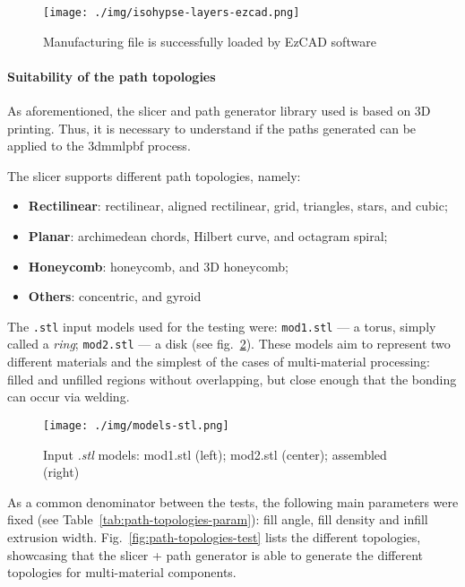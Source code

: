 \begin{figure}[!hbt]
  \centering
  \texttt{[image: ./img/isohypse-layers-ezcad.png]}
  \caption{Manufacturing file is successfully loaded by EzCAD software}%
  \label{fig:isohypse-ezcad}
\end{figure}

\paragraph{Suitability of the path topologies}
As aforementioned, the slicer and path generator library used is based on 3D
printing. Thus, it is necessary to understand if the paths generated can be
applied to the \gls{3dmmlpbf} process.

The slicer supports different path topologies, namely:
\begin{itemize}
\item \textbf{Rectilinear}: rectilinear, aligned rectilinear, grid, triangles,
  stars, and cubic;
\item \textbf{Planar}: archimedean chords, Hilbert curve, and octagram spiral;
\item \textbf{Honeycomb}: honeycomb, and 3D honeycomb;
\item \textbf{Others}: concentric, and gyroid
\end{itemize}

The \texttt{.stl} input models used for the testing were: \texttt{mod1.stl} ---
a torus, simply called a \emph{ring}; \texttt{mod2.stl} --- a disk (see fig.~\ref{fig:models-stl}). These models
aim to represent two different materials and the simplest of the cases of
multi-material processing: filled and unfilled regions without overlapping, but
close enough that the bonding can occur via welding.
\begin{figure}[!hbt]
  \centering
 \texttt{[image: ./img/models-stl.png]} 
  \caption[Input \emph{.stl} models]{Input \emph{.stl} models: mod1.stl (left);
    mod2.stl (center); assembled (right)}%
\label{fig:models-stl}
\end{figure}

As a common denominator between the tests, the following main parameters were
fixed (see Table~\ref{tab:path-topologies-param}): fill angle, fill density and
infill extrusion width. Fig.~\ref{fig:path-topologies-test} lists the different
topologies, showcasing that the slicer + path generator is able to generate the
different topologies for multi-material components.

